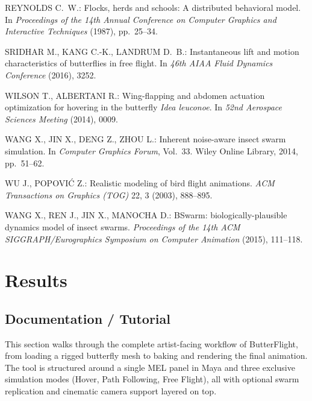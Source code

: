 \documentclass[12pt]{article}
\begin{document}
\medskip\noindent
[Rey87] REYNOLDS C.~W.: Flocks, herds and schools: A distributed behavioral
model. In \textit{Proceedings of the 14th Annual Conference on Computer
Graphics and Interactive Techniques} (1987), pp.~25--34.

\medskip\noindent
[SKL16] SRIDHAR M., KANG C.-K., LANDRUM D.~B.: Instantaneous lift and
motion characteristics of butterflies in free flight. In \textit{46th AIAA
Fluid Dynamics Conference} (2016), 3252.

\medskip\noindent
[WA14] WILSON T., ALBERTANI R.: Wing-flapping and abdomen actuation
optimization for hovering in the butterfly \textit{Idea leuconoe}. In
\textit{52nd Aerospace Sciences Meeting} (2014), 0009.

\medskip\noindent
[WJDZ14] WANG X., JIN X., DENG Z., ZHOU L.: Inherent noise-aware insect
swarm simulation. In \textit{Computer Graphics Forum}, Vol.~33. Wiley Online
Library, 2014, pp.~51--62.

\medskip\noindent
[WP03] WU J., POPOVI\'C Z.: Realistic modeling of bird flight animations.
\textit{ACM Transactions on Graphics (TOG)} 22, 3 (2003), 888--895.

\medskip\noindent
[WRJM15] WANG X., REN J., JIN X., MANOCHA D.: BSwarm:
biologically-plausible dynamics model of insect swarms.
\textit{Proceedings of the 14th ACM SIGGRAPH/Eurographics Symposium on
Computer Animation} (2015), 111--118.

\newpage



\section{Results}

\subsection{Documentation / Tutorial}

This section walks through the complete artist-facing workflow of ButterFlight,
from loading a rigged butterfly mesh to baking and rendering the final
animation.  The tool is structured around a single MEL panel in Maya and three
exclusive simulation modes (Hover, Path Following, Free Flight), all with
optional swarm replication and cinematic camera support layered on top.
\end{document}
